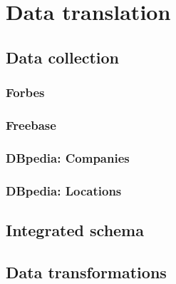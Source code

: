 \section{Data translation}
\subsection{Data collection}

\subsubsection{Forbes}

\subsubsection{Freebase}

\subsubsection{DBpedia: Companies}

\subsubsection{DBpedia: Locations}

\subsection{Integrated schema}



\subsection{Data transformations}




